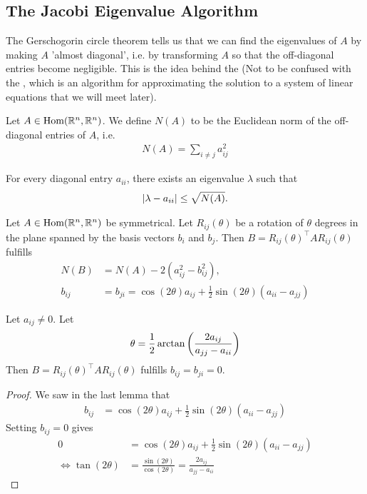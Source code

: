 \subsection{The Jacobi Eigenvalue Algorithm}
The Gerschogorin circle theorem tells us that we can find the eigenvalues of $A$ by making $A$ 'almost diagonal', i.e. by transforming $A$ so that the off-diagonal entries become negligible. This is the idea behind the  (Not to be confused with the , which is an algorithm for approximating the solution to a system of linear equations that we will meet later).
\begin{definition}
	Let $A \in \textnormal{Hom}(\mathbb{R}^n, \mathbb{R}^n)$. We define $N(A)$ to be the Euclidean norm of the off-diagonal entries of $A$, i.e.
	\begin{align*}
		N(A) = \sum_{i \neq j} a_{ij}^2
	\end{align*}
\end{definition}
\begin{proposition}
	For every diagonal entry $a_{ii}$, there exists an eigenvalue $\lambda$ such that
	\begin{align*}
		\abs{\lambda - a_{ii}} \leq \sqrt{N(A)}.
	\end{align*}
\end{proposition}
\begin{lemma}
	Let $A \in \textnormal{Hom}(\mathbb{R}^n, \mathbb{R}^n)$ be symmetrical. Let $R_{ij}(\theta)$ be a rotation of $\theta$ degrees in the plane spanned by the basis vectors $b_i$ and $b_j$. Then $B = R_{ij}(\theta)^\top A R_{ij}(\theta)$ fulfills
	\begin{align*}
		N(B) &= N(A) - 2(a_{ij}^2 - b_{ij}^2),\\
		b_{ij} &= b_{ji} = \cos(2\theta)a_{ij} + \frac{1}{2}\sin(2\theta)(a_{ii} - a_{jj})
	\end{align*}
\end{lemma}
\begin{lemma}
	Let $a_{ij} \neq 0$. Let
	\begin{align*}
		\theta = \frac{1}{2}\arctan \qty( \frac{2a_{ij}}{a_{jj} - a_{ii}})
	\end{align*}
	Then $B = R_{ij}(\theta)^\top A R_{ij}(\theta)$ fulfills $b_{ij} = b_{ji} = 0$.
\end{lemma}
\begin{proof}
	We saw in the last lemma that 
	\begin{align*}
		b_{ij} &= \cos(2\theta)a_{ij} + \frac{1}{2}\sin(2\theta)(a_{ii} - a_{jj})
	\end{align*}
	Setting $b_{ij} = 0$ gives
	\begin{align*}
		0 &= \cos(2\theta)a_{ij} + \frac{1}{2}\sin(2\theta)(a_{ii} - a_{jj})\\
		\Longleftrightarrow
		\tan(2\theta) &= \frac{\sin(2\theta)}{\cos(2\theta)} = \frac{2a_{ij}}{a_{jj} - a_{ii}}
	\end{align*}
\end{proof}
